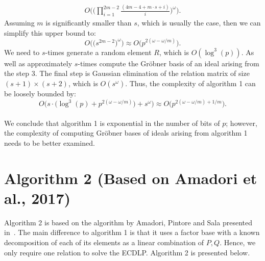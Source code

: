 \documentclass[thesis=M,english]{FITthesis}[2012/10/20]
\theoremstyle{remark}
\theoremstyle{definition}
\begin{document}
\begin{align*}
O\Bigg(\bigg(\prod_{i=1}^{2m-2}\frac{(4m-4+m\cdot s + i)}{i}\bigg)^\omega\Bigg).
\end{align*}
Assuming $m$ is significantly smaller than $s$, which is usually the case, then we can simplify this upper bound to:
$$
O\Bigg(\bigg(s^{2m-2}\bigg)^\omega\Bigg) \approx O\bigg(p^{2(\omega -\omega/m)}\bigg).
$$
We need to $s$-times generate a random element $R$, which is $O(\log^3(p))$. As well as approximately $s$-times compute the Gröbner basis of an ideal arising from the step 3. The final step is Gaussian elimination of the relation matrix of size $(s + 1)  \times (s+2)$, which is $O(s^\omega)$. Thus, the complexity of algorithm 1 can be loosely bounded by:
$$
O\bigg(s\cdot\big(\log^3(p) + p^{2(\omega -\omega / m)}\big) + s^\omega\bigg) \approx O\bigg(p^{2(\omega -\omega/m) + 1/m}\bigg).
$$
 \\
 \noindent We conclude that algorithm 1 is exponential in the number of bits of $p$; however, the complexity of computing Gröbner bases of ideals arising from algorithm 1 needs to be better examined. 
\section{Algorithm 2 (Based on Amadori et al., 2017)}
Algorithm 2 is based on the algorithm by Amadori, Pintore and Sala presented in~\cite{amadori17}. The main difference to algorithm 1 is that it uses a factor base with a known decomposition of each of its elements as a linear combination of $P,Q$. Hence, we only require one relation to solve the ECDLP. Algorithm 2 is presented below. \\
\end{document}
